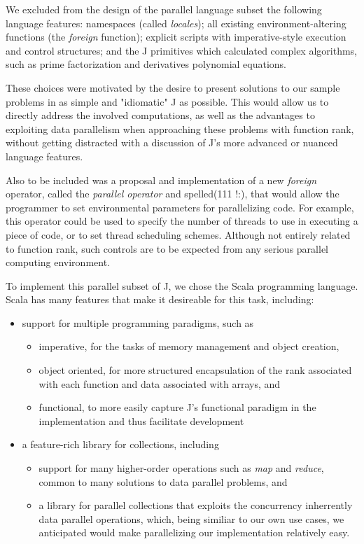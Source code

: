 We excluded from the design of the parallel language subset the following language features: 
namespaces (called \textit{locales});
all existing environment-altering functions (the \textit{foreign} function);
explicit scripts with imperative-style execution and control structures;
and the J primitives which calculated complex algorithms, such as prime factorization and derivatives polynomial equations.

These choices were motivated by the desire to present solutions to our sample problems in as simple and "idiomatic" J as possible.
This would allow us to directly address the involved computations, as well as the advantages to exploiting data parallelism when approaching these problems with function rank, 
without getting distracted with a discussion of J's more advanced or nuanced language features.

Also to be included was a proposal and implementation of a new \textit{foreign} operator, called the \textit{parallel operator} and spelled\ttfamily (111 !:)\normalfont , 
that would allow the programmer to set environmental parameters for parallelizing code.
For example, this operator could be used to specify the number of threads to use in executing a piece of code, 
or to set thread scheduling schemes.
Although not entirely related to function rank, such controls are to be expected from any serious parallel computing environment.

To implement this parallel subset of J, we chose the Scala programming language.\cite{scala} 
Scala has many features that make it desireable for this task, including: 
\begin{itemize}
	\item support for multiple programming paradigms, such as
	\begin{itemize}
		\item imperative, for the tasks of memory management and object creation,
		\item object oriented, for more structured encapsulation of the rank associated with each function 
			and data associated with arrays, and
		\item functional, to more easily capture J's functional paradigm in the implementation and thus facilitate development
	\end{itemize}
	\item a feature-rich library for collections, including 
	\begin{itemize}
		\item support for many higher-order operations such as \textit{map} and \textit{reduce}, \cite{scala28col}
			common to many solutions to data parallel problems, and
		\item a library for parallel collections that exploits the concurrency inherrently data parallel operations,\cite{pc}
			which, being similiar to our own use cases, we anticipated would make parallelizing our implementation relatively easy.
	\end{itemize}
\end{itemize}

